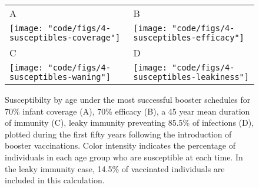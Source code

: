 \documentclass[12pt]{article}
\begin{document}
\begin{figure}

\begin{tabular}{ll}
A&B\\
\texttt{[image: "code/figs/4-susceptibles-coverage"]}&
\texttt{[image: "code/figs/4-susceptibles-efficacy"]}  \\
C&D\\
\texttt{[image: "code/figs/4-susceptibles-waning"]} &
\texttt{[image: "code/figs/4-susceptibles-leakiness"]}\\



\end{tabular}

\caption{\footnotesize Susceptibilty by age under the most successful booster schedules for
70\% infant coverage (A), 70\% efficacy (B),
a 45 year mean duration of immunity (C),  
leaky immunity preventing 85.5\% of infections (D),
plotted during the first fifty years following the introduction of booster vaccinations.
Color intensity indicates the percentage of individuals in each age group who are susceptible at each time.
In the leaky immunity case, 14.5\% of vaccinated individuals are included in this calculation.
}


\label{fig:Susceptibles}
\end{figure}
\end{document}
